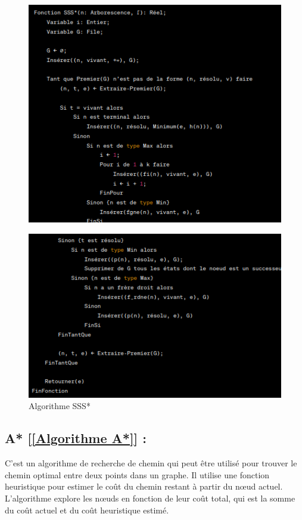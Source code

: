 \documentclass[12pt]{article}
\begin{document}
		\begin{figure}[H]
		\centering
		\includegraphics[scale=0.7]{img/sss1}
	\end{figure}
		\begin{figure}[H]
		\centering
		\includegraphics[scale=0.7]{img/sss2}
		\caption{Algorithme SSS* }
		\label{Algorithme SSS*}
	\end{figure}
	
\subsection{A* [\ref{Algorithme A*}] :} C'est un algorithme de recherche de chemin qui peut être utilisé pour trouver le chemin optimal entre deux points dans un graphe. Il utilise une fonction heuristique pour estimer le coût du chemin restant à partir du nœud actuel. L'algorithme explore les nœuds en fonction de leur coût total, qui est la somme du coût actuel et du coût heuristique estimé.
\end{document}
